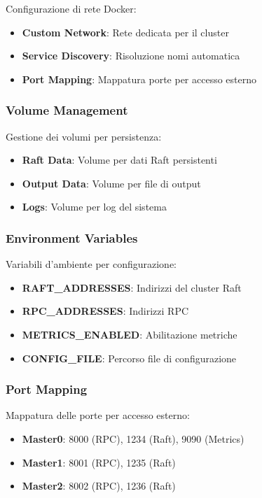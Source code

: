 \documentclass[12pt,a4paper]{article}
\begin{document}
Configurazione di rete Docker:

\begin{itemize}
\item \textbf{Custom Network}: Rete dedicata per il cluster
\item \textbf{Service Discovery}: Risoluzione nomi automatica
\item \textbf{Port Mapping}: Mappatura porte per accesso esterno
\end{itemize}

\subsubsection{Volume Management}

Gestione dei volumi per persistenza:

\begin{itemize}
\item \textbf{Raft Data}: Volume per dati Raft persistenti
\item \textbf{Output Data}: Volume per file di output
\item \textbf{Logs}: Volume per log del sistema
\end{itemize}

\subsubsection{Environment Variables}

Variabili d'ambiente per configurazione:

\begin{itemize}
\item \textbf{RAFT\_ADDRESSES}: Indirizzi del cluster Raft
\item \textbf{RPC\_ADDRESSES}: Indirizzi RPC
\item \textbf{METRICS\_ENABLED}: Abilitazione metriche
\item \textbf{CONFIG\_FILE}: Percorso file di configurazione
\end{itemize}

\subsubsection{Port Mapping}

Mappatura delle porte per accesso esterno:

\begin{itemize}
\item \textbf{Master0}: 8000 (RPC), 1234 (Raft), 9090 (Metrics)
\item \textbf{Master1}: 8001 (RPC), 1235 (Raft)
\item \textbf{Master2}: 8002 (RPC), 1236 (Raft)
\end{itemize}
\end{document}
